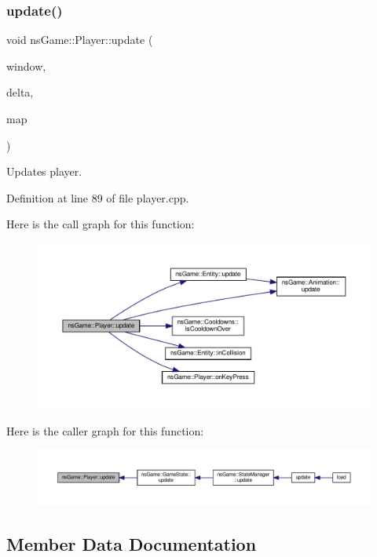 \subsubsection{\texorpdfstring{update()}{update()}}
{\footnotesize\ttfamily void ns\+Game\+::\+Player\+::update (\begin{DoxyParamCaption}\item[{Min\+GL \&}]{window,  }\item[{unsigned}]{delta,  }\item[{\hyperlink{type_8h_a64a592133575ccebb1b36453acbec02b}{C\+Mat}}]{map }\end{DoxyParamCaption})}



Updates player. 



Definition at line 89 of file player.\+cpp.

Here is the call graph for this function\+:\nopagebreak
\begin{figure}[H]
\begin{center}
\leavevmode
\includegraphics[width=350pt]{classns_game_1_1_player_a8702d56a2f8651a53511b4dbea30d0f6_cgraph}
\end{center}
\end{figure}
Here is the caller graph for this function\+:\nopagebreak
\begin{figure}[H]
\begin{center}
\leavevmode
\includegraphics[width=350pt]{classns_game_1_1_player_a8702d56a2f8651a53511b4dbea30d0f6_icgraph}
\end{center}
\end{figure}


\subsection{Member Data Documentation}
\mbox{\label{classns_game_1_1_player_a7dc24a02c5afb2d939ac8cff0c43de09}} 
